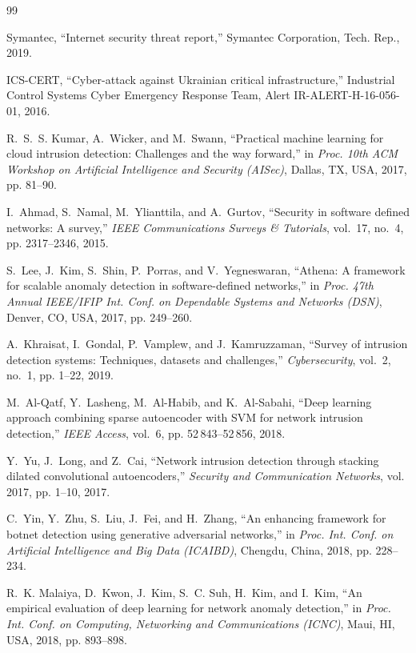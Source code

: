 \documentclass[conference]{IEEEtran}
\begin{document}
\begin{thebibliography}{99}

Symantec, ``Internet security threat report,'' Symantec Corporation, Tech. Rep., 2019.

ICS-CERT, ``Cyber-attack against Ukrainian critical infrastructure,'' Industrial Control Systems Cyber Emergency Response Team, Alert IR-ALERT-H-16-056-01, 2016.

R.~S.~S. Kumar, A.~Wicker, and M.~Swann, ``Practical machine learning for cloud intrusion detection: Challenges and the way forward,'' in \emph{Proc. 10th ACM Workshop on Artificial Intelligence and Security (AISec)}, Dallas, TX, USA, 2017, pp. 81--90.

I.~Ahmad, S.~Namal, M.~Ylianttila, and A.~Gurtov, ``Security in software defined networks: A survey,'' \emph{IEEE Communications Surveys \& Tutorials}, vol.~17, no.~4, pp. 2317--2346, 2015.

S.~Lee, J.~Kim, S.~Shin, P.~Porras, and V.~Yegneswaran, ``Athena: A framework for scalable anomaly detection in software-defined networks,'' in \emph{Proc. 47th Annual IEEE/IFIP Int. Conf. on Dependable Systems and Networks (DSN)}, Denver, CO, USA, 2017, pp. 249--260.

A.~Khraisat, I.~Gondal, P.~Vamplew, and J.~Kamruzzaman, ``Survey of intrusion detection systems: Techniques, datasets and challenges,'' \emph{Cybersecurity}, vol.~2, no.~1, pp. 1--22, 2019.

M.~Al-Qatf, Y.~Lasheng, M.~Al-Habib, and K.~Al-Sabahi, ``Deep learning approach combining sparse autoencoder with SVM for network intrusion detection,'' \emph{IEEE Access}, vol.~6, pp. 52\,843--52\,856, 2018.

Y.~Yu, J.~Long, and Z.~Cai, ``Network intrusion detection through stacking dilated convolutional autoencoders,'' \emph{Security and Communication Networks}, vol. 2017, pp. 1--10, 2017.

C.~Yin, Y.~Zhu, S.~Liu, J.~Fei, and H.~Zhang, ``An enhancing framework for botnet detection using generative adversarial networks,'' in \emph{Proc. Int. Conf. on Artificial Intelligence and Big Data (ICAIBD)}, Chengdu, China, 2018, pp. 228--234.

R.~K. Malaiya, D.~Kwon, J.~Kim, S.~C. Suh, H.~Kim, and I.~Kim, ``An empirical evaluation of deep learning for network anomaly detection,'' in \emph{Proc. Int. Conf. on Computing, Networking and Communications (ICNC)}, Maui, HI, USA, 2018, pp. 893--898.


\end{thebibliography}
\end{document}

